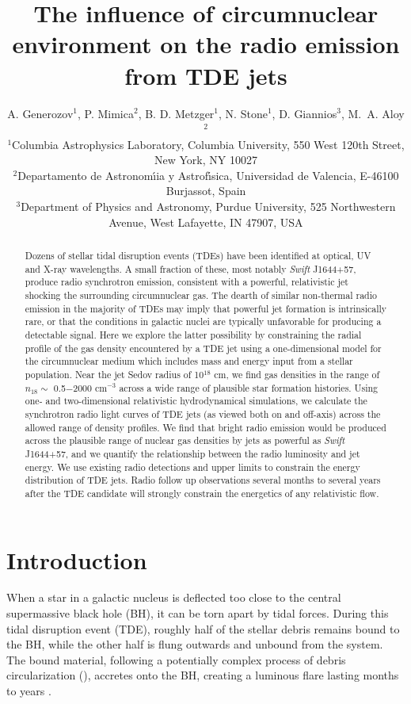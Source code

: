 \documentclass[usenatbib,fleqn]{mnras}
\title[Influence of CNM on TDE radio emission]{The influence of
  circumnuclear environment on the radio emission from TDE jets}
\author[Generozov et al.]{ A. Generozov$^{1}$, P. Mimica$^{2}$,
  B. D. Metzger$^{1}$, N. Stone$^{1}$, D. Giannios$^{3}$, 
  M.~A. Aloy$^{2}$
  \\
  $^{1}$Columbia Astrophysics Laboratory, Columbia University, 550 West 120th Street, New York, NY 10027\\
  $^{2}$Departamento de Astronom\'{\i}ia y Astrof\'{\i}sica, Universidad de Valencia, E-46100 Burjassot, Spain\\
  $^{3}$Department of Physics and Astronomy, Purdue University, 525
  Northwestern Avenue, West Lafayette, IN 47907, USA}
\begin{document}
\maketitle
\begin{abstract}
  Dozens of stellar tidal disruption events (TDEs) have been
  identified at optical, UV and X-ray wavelengths.  A small fraction
  of these, most notably {\it Swift} J1644+57, produce radio
  synchrotron emission, consistent with a powerful, relativistic jet
  shocking the surrounding circumnuclear gas.  The dearth of similar
  non-thermal radio emission in the majority of TDEs may imply that
  powerful jet formation is intrinsically rare, or that the conditions
  in galactic nuclei are typically unfavorable for producing a
  detectable signal.  Here we explore the latter possibility by
  constraining the radial profile of the gas density encountered by a
  TDE jet using a one-dimensional model for the circumnuclear medium
  which includes mass and energy input from a stellar population.
  Near the jet Sedov radius of 10$^{18}$ cm, we find gas densities in
  the range of $n_{18} \sim$ 0.5$-$2000 cm$^{-3}$ across a wide range
  of plausible star formation histories.  Using one- and
  two-dimensional relativistic hydrodynamical simulations, we
  calculate the synchrotron radio light curves of TDE jets (as viewed
  both on and off-axis) across the allowed range of density profiles.
  We find that bright radio emission would be produced across the
  plausible range of nuclear gas densities by jets as powerful as {\it
    Swift} J1644+57, and we quantify the relationship between the
  radio luminosity and jet energy.  We use existing radio detections
  and upper limits to constrain the energy distribution of TDE jets.
  Radio follow up observations several months to several years after the TDE
  candidate will strongly constrain the energetics of any relativistic
  flow.
\end{abstract}
\section{Introduction}
\label{sec:intro}
When a star in a galactic nucleus is deflected too close to the
central supermassive black hole (BH), it can be torn apart by tidal
forces.  During this tidal disruption event (TDE), roughly half of the
stellar debris remains bound to the BH, while the other half is flung
outwards and unbound from the system.  The bound material, following a
potentially complex process of debris circularization
(\citealt{Kochanek1994,Guillochon+2013,Hayasaki+2013,Hayasaki+2015,Shiokawa+2015,Bonnerot+2015}),
accretes onto the BH, creating a luminous flare lasting months to
years \citep{Hills1975, Carter+1982, Rees1988}.
\end{document}
